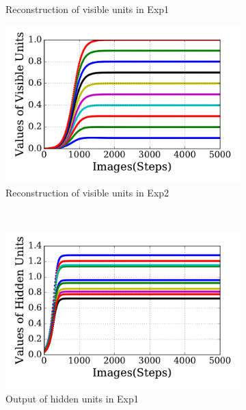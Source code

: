 \begin{figure}
\begin{subfigure}[t]{0.45\textwidth}
		\caption{Reconstruction of visible units in Exp1}
	\end{subfigure}
	\begin{subfigure}[t]{0.45\textwidth}
		\includegraphics[width=\textwidth]{pics_sdlm/20_exp_AE/exp2_recon_non.pdf}
		\caption{Reconstruction of visible units in Exp2}
	\end{subfigure}\\
	\begin{subfigure}[t]{0.45\textwidth}
		\includegraphics[width=\textwidth]{pics_sdlm/20_exp_AE/exp1_hid_non.pdf}
		\caption{Output of hidden units in Exp1}
	\end{subfigure}
	\begin{subfigure}[t]{0.45\textwidth}

\end{subfigure}
\end{figure}
